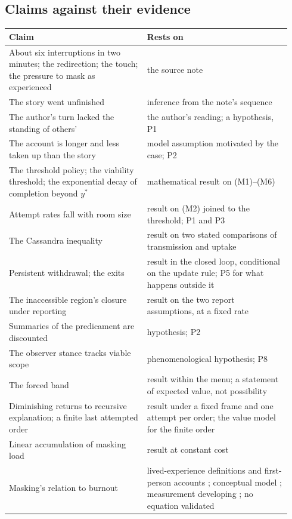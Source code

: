 \subsection{Claims against their evidence}

\begin{center}\small
\begin{tabular}{p{0.46\linewidth} p{0.48\linewidth}}
\toprule
Claim & Rests on \\
\midrule
About six interruptions in two minutes; the redirection; the touch; the pressure to mask as experienced & the source note \\
The story went unfinished & inference from the note's sequence \\
The author's turn lacked the standing of others' & the author's reading; a hypothesis, P1 \\
The account is longer and less taken up than the story & model assumption motivated by the case; P2 \\
The threshold policy; the viability threshold; the exponential decay of completion beyond $y^{*}$ & mathematical result on (M1)--(M6) \\
Attempt rates fall with room size & result on (M2) joined to the threshold; P1 and P3 \\
The Cassandra inequality & result on two stated comparisons of transmission and uptake \\
Persistent withdrawal; the exits & result in the closed loop, conditional on the update rule; P5 for what happens outside it \\
The inaccessible region's closure under reporting & result on the two report assumptions, at a fixed rate \\
Summaries of the predicament are discounted & hypothesis; P2 \\
The observer stance tracks viable scope & phenomenological hypothesis; P8 \\
The forced band & result within the menu; a statement of expected value, not possibility \\
Diminishing returns to recursive explanation; a finite last attempted order & result under a fixed frame and one attempt per order; the value model for the finite order \\
Linear accumulation of masking load & result at constant cost \\
Masking's relation to burnout & lived-experience definitions and first-person accounts \cite{Raymaker2020, Higgins2021, Mantzalas2022b}; conceptual model \cite{Mantzalas2022a}; measurement developing \cite{Mantzalas2024}; no equation validated \\

\end{tabular}
\end{center}

